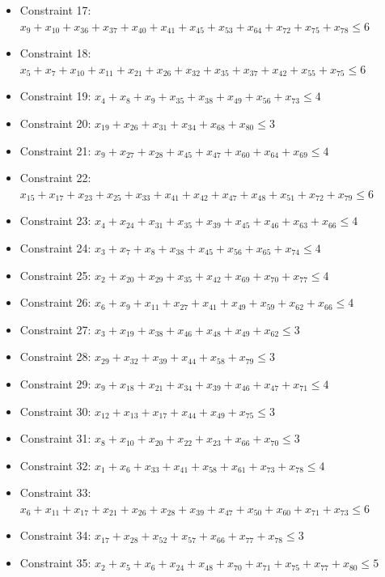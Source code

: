 \documentclass[11pt]{article}
\begin{document}
\begin{itemize}
\item Constraint 17: $x_{9} + x_{10} + x_{36} + x_{37} + x_{40} + x_{41} + x_{45} + x_{53} + x_{64} + x_{72} + x_{75} + x_{78} \le 6$
\item Constraint 18: $x_{5} + x_{7} + x_{10} + x_{11} + x_{21} + x_{26} + x_{32} + x_{35} + x_{37} + x_{42} + x_{55} + x_{75} \le 6$
\item Constraint 19: $x_{4} + x_{8} + x_{9} + x_{35} + x_{38} + x_{49} + x_{56} + x_{73} \le 4$
\item Constraint 20: $x_{19} + x_{26} + x_{31} + x_{34} + x_{68} + x_{80} \le 3$
\item Constraint 21: $x_{9} + x_{27} + x_{28} + x_{45} + x_{47} + x_{60} + x_{64} + x_{69} \le 4$
\item Constraint 22: $x_{15} + x_{17} + x_{23} + x_{25} + x_{33} + x_{41} + x_{42} + x_{47} + x_{48} + x_{51} + x_{72} + x_{79} \le 6$
\item Constraint 23: $x_{4} + x_{24} + x_{31} + x_{35} + x_{39} + x_{45} + x_{46} + x_{63} + x_{66} \le 4$
\item Constraint 24: $x_{3} + x_{7} + x_{8} + x_{38} + x_{45} + x_{56} + x_{65} + x_{74} \le 4$
\item Constraint 25: $x_{2} + x_{20} + x_{29} + x_{35} + x_{42} + x_{69} + x_{70} + x_{77} \le 4$
\item Constraint 26: $x_{6} + x_{9} + x_{11} + x_{27} + x_{41} + x_{49} + x_{59} + x_{62} + x_{66} \le 4$
\item Constraint 27: $x_{3} + x_{19} + x_{38} + x_{46} + x_{48} + x_{49} + x_{62} \le 3$
\item Constraint 28: $x_{29} + x_{32} + x_{39} + x_{44} + x_{58} + x_{79} \le 3$
\item Constraint 29: $x_{9} + x_{18} + x_{21} + x_{34} + x_{39} + x_{46} + x_{47} + x_{71} \le 4$
\item Constraint 30: $x_{12} + x_{13} + x_{17} + x_{44} + x_{49} + x_{75} \le 3$
\item Constraint 31: $x_{8} + x_{10} + x_{20} + x_{22} + x_{23} + x_{66} + x_{70} \le 3$
\item Constraint 32: $x_{1} + x_{6} + x_{33} + x_{41} + x_{58} + x_{61} + x_{73} + x_{78} \le 4$
\item Constraint 33: $x_{6} + x_{11} + x_{17} + x_{21} + x_{26} + x_{28} + x_{39} + x_{47} + x_{50} + x_{60} + x_{71} + x_{73} \le 6$
\item Constraint 34: $x_{17} + x_{28} + x_{52} + x_{57} + x_{66} + x_{77} + x_{78} \le 3$
\item Constraint 35: $x_{2} + x_{5} + x_{6} + x_{24} + x_{48} + x_{70} + x_{71} + x_{75} + x_{77} + x_{80} \le 5$

\end{itemize}
\end{document}

